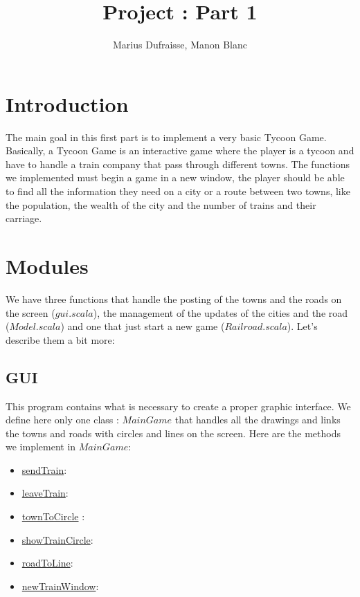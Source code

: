 \documentclass[a4paper]{article}
\title{Project : Part 1}
\author{Marius Dufraisse, Manon Blanc}
\date{ }
\begin{document}
	\maketitle
	\thispagestyle{fancy}
	\section{Introduction}
	
	The main goal in this first part is to implement a very basic Tycoon Game. Basically, a Tycoon Game is an interactive game where the player is a tycoon and have to handle a train company that pass through different towns. The functions we implemented must begin a game in a new window, the player should be able to find all the information they need on a city or a route between two towns, like the population, the wealth of the city and the number of trains and their carriage. 
	
	\section{Modules}
	
	We have three functions that handle the posting of the towns and the roads on the screen ($gui.scala$), the management of the updates of the cities and the road ($Model.scala$) and one that just start a new game ($Railroad.scala$). Let's describe them a bit more:
	
	\subsection{GUI}
	This program contains what is necessary to create a proper graphic interface. We define here only one class : $MainGame$ that handles all the drawings and links the towns and roads with circles and lines on the screen.
	Here are the methods we implement in $MainGame$:
	\begin{itemize}
		\item \underline{sendTrain}:
		\item \underline{leaveTrain}:
		\item \underline{townToCircle} :
		\item \underline{showTrainCircle}:
		\item \underline{roadToLine}:
		\item \underline{newTrainWindow}:
	\end{itemize}
	
\end{document}
